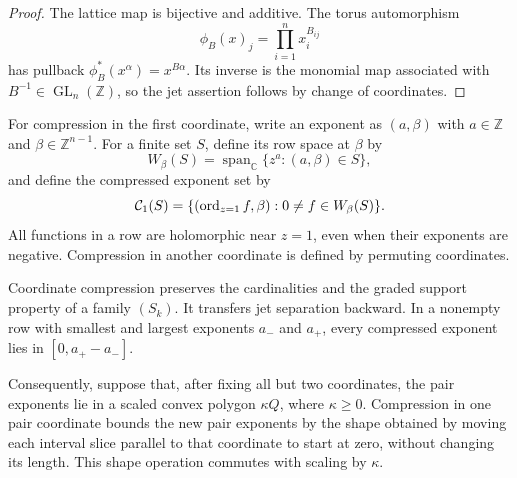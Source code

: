 \begin{proof}
The lattice map is bijective and additive. The torus automorphism
\[
 \phi_B(x)_j=\prod_{i=1}^n x_i^{B_{ij}}
\]
has pullback $\phi_B^*(x^\alpha)=x^{B\alpha}$. Its inverse is the monomial map associated with $B^{-1}\in\operatorname{GL}_n(\mathbb{Z})$, so the jet assertion follows by change of coordinates.
\end{proof}

For compression in the first coordinate, write an exponent as $(a,\beta)$ with $a\in\mathbb{Z}$ and $\beta\in\mathbb{Z}^{n-1}$. For a finite set $S$, define its row space at $\beta$ by
\[
 W_\beta(S)=\operatorname{span}_\mathbb{C}\{z^a:(a,\beta)\in S\},
\]
and define the compressed exponent set by
\begin{equation}\label{eq:coordinate-compression}
 \mathcal{C}_1(S)=
 \{(\operatorname{ord}_{z=1}f,\beta):0\ne f\in W_\beta(S)\}.
\end{equation}
All functions in a row are holomorphic near $z=1$, even when their exponents are negative. Compression in another coordinate is defined by permuting coordinates.

\begin{lemma}\label{lem:compression}
Coordinate compression preserves the cardinalities and the graded support property of a family $(S_k)$. It transfers jet separation backward. In a nonempty row with smallest and largest exponents $a_-$ and $a_+$, every compressed exponent lies in $[0,a_+-a_-]$.

Consequently, suppose that, after fixing all but two coordinates, the pair exponents lie in a scaled convex polygon $\kappa Q$, where $\kappa\geq0$. Compression in one pair coordinate bounds the new pair exponents by the shape obtained by moving each interval slice parallel to that coordinate to start at zero, without changing its length. This shape operation commutes with scaling by $\kappa$.
\end{lemma}

